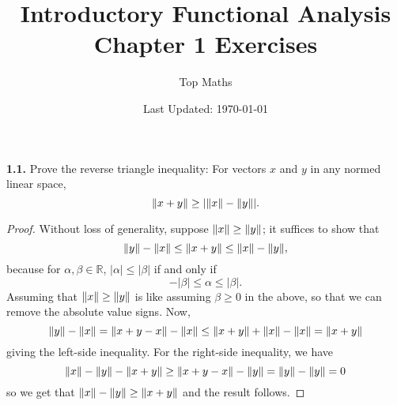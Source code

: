\documentclass[12pt]{article}
\title{Introductory Functional Analysis \\ Chapter 1 Exercises}
\date{Last Updated: \today}
\author{Top Maths}
\theoremstyle{definition}
\begin{document}
	\maketitle 
	
	\noindent \textbf{1.1.} Prove the reverse triangle inequality: For vectors $x$ and $y$ in any normed linear space, $$\norm{x + y} \geq \abs{\norm{x} - \norm{y}}.$$
		\begin{proof}
			Without loss of generality, suppose $\norm{x} \geq \norm{y}$; it suffices to show that $$\norm{y} - \norm{x} \leq \norm{x + y} \leq \norm{x} - \norm{y},$$ because for $\alpha, \beta \in \mathbb{R}$, $|\alpha| \leq |\beta|$ if and only if $$-|\beta| \leq \alpha \leq |\beta|.$$ Assuming that $\norm{x} \geq \norm{y}$ is like assuming $\beta \geq 0$ in the above, so that we can remove the absolute value signs. Now, $$\norm{y} - \norm{x} = \norm{x + y - x} - \norm{x} \leq \norm{x + y} + \norm{x} - \norm{x} = \norm{x + y}$$ giving the left-side inequality. For the right-side inequality, we have 
			$$\norm{x} - \norm{y} - \norm{x + y} \geq \norm{x + y - x} - \norm{y} = \norm{y} - \norm{y} = 0$$ so we get that $\norm{x} - \norm{y} \geq \norm{x + y}$ and the result follows. 
		\end{proof}
	
\end{document}
